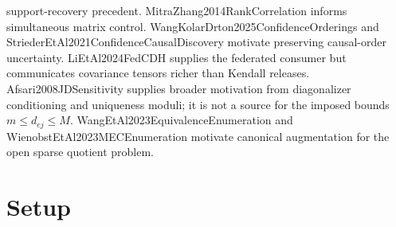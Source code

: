 \documentclass{article}
\begin{document}
support-recovery precedent. MitraZhang2014RankCorrelation informs simultaneous matrix control. WangKolarDrton2025ConfidenceOrderings and StriederEtAl2021ConfidenceCausalDiscovery motivate preserving causal-order uncertainty. LiEtAl2024FedCDH supplies the federated consumer but communicates covariance tensors richer than Kendall releases. Afsari2008JDSensitivity supplies broader motivation from diagonalizer conditioning and uniqueness moduli; it is not a source for the imposed bounds \(m\le d_{ej}\le M\). WangEtAl2023EquivalenceEnumeration and WienobstEtAl2023MECEnumeration motivate canonical augmentation for the open sparse quotient problem.

\section{Setup}
\end{document}
